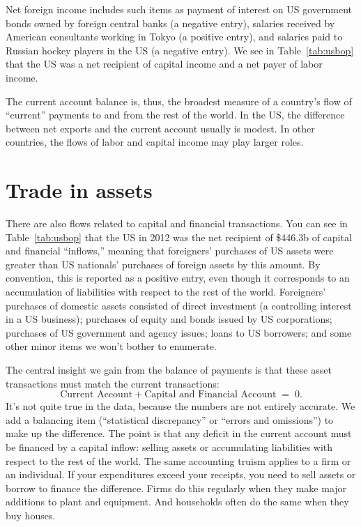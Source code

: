 Net foreign income includes such items as payment of interest
on US government bonds owned by foreign central banks  (a negative entry),
salaries received by American consultants working in Tokyo
(a positive entry),
and salaries paid to Russian hockey players in the US
(a negative entry).
We see in Table~\ref{tab:usbop} that 
the US was a net recipient of capital income and a net payer
of labor income.


The current account balance is, thus, the broadest measure of a country's flow
of ``current'' payments to and from the rest of the world. In the
US, the difference between net exports and the current
account usually is modest. In other countries, the flows
of labor and capital income may play larger roles.



\section{Trade in assets}

There are also flows related to capital and financial
transactions.
You can see in Table~\ref{tab:usbop} that the US in 2012 was the net recipient of
\$446.3b of capital and financial ``inflows,'' meaning that
foreigners' purchases of US assets were greater than US nationals'
purchases of foreign assets by this amount.
By convention, this is reported as a
positive entry, even though it corresponds to an accumulation of
liabilities with respect to the rest of the world.  Foreigners' purchases
of domestic assets consisted of direct investment (a controlling
interest in a US business); purchases of equity and bonds issued by
US corporations; purchases of US government and agency issues; loans to US borrowers; and
some other minor items we won't bother to enumerate.

The central insight we gain from the balance of payments
is that these asset transactions must match the current transactions:
\[
    \mbox{Current Account} + \mbox{Capital and Financial Account} \;=\; 0.
\]
It's not quite true in the data, because the numbers are not
entirely accurate.
We add a balancing item
(``statistical discrepancy'' or ``errors and omissions'') to make up the
difference. The point is that any deficit in the current account
must be financed by a capital inflow:
selling assets or accumulating liabilities with
respect to the rest of the world.  The same accounting
 truism applies to a firm or an individual.  If your expenditures exceed
your receipts, you need to sell assets or borrow to finance the
difference. Firms do this regularly when they make major additions
to plant and equipment. And households often do the same when they
buy houses.

